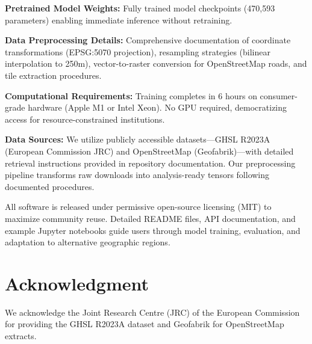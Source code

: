 \documentclass[conference]{IEEEtran}
\begin{document}
\textbf{Pretrained Model Weights:} Fully trained model checkpoints (470,593 parameters) enabling immediate inference without retraining.

\textbf{Data Preprocessing Details:} Comprehensive documentation of coordinate transformations (EPSG:5070 projection), resampling strategies (bilinear interpolation to 250m), vector-to-raster conversion for OpenStreetMap roads, and tile extraction procedures.

\textbf{Computational Requirements:} Training completes in 6 hours on consumer-grade hardware (Apple M1 or Intel Xeon). No GPU required, democratizing access for resource-constrained institutions.

\textbf{Data Sources:} We utilize publicly accessible datasets---GHSL R2023A (European Commission JRC) and OpenStreetMap (Geofabrik)---with detailed retrieval instructions provided in repository documentation. Our preprocessing pipeline transforms raw downloads into analysis-ready tensors following documented procedures.

All software is released under permissive open-source licensing (MIT) to maximize community reuse. Detailed README files, API documentation, and example Jupyter notebooks guide users through model training, evaluation, and adaptation to alternative geographic regions.

\section*{Acknowledgment}
We acknowledge the Joint Research Centre (JRC) of the European Commission for providing the GHSL R2023A dataset and Geofabrik for OpenStreetMap extracts.
\end{document}
